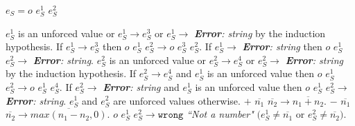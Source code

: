 \begin{case}

$e_{S}=o$ $e_{S}^{1}$ $e_{S}^{2}$

$e_{S}^{1}$ is an unforced value or $e_{S}^{1}\rightarrow e_{S}^{3}$ or $e_{S}^{1}\rightarrow$ \emph{\textbf{Error}: string} by the induction hypothesis.  If $e_{S}^{1}\rightarrow e_{S}^{3}$ then $o$ $e_{S}^{1}$ $e_{S}^{2}\rightarrow o$ $e_{S}^{3}$ $e_{S}^{2}$.  If $e_{S}^{1}\rightarrow$ \emph{\textbf{Error}: string} then $o$ $e_{S}^{1}$ $e_{S}^{2}\rightarrow$ \emph{\textbf{Error}: string}.  $e_{S}^{2}$ is an unforced value or $e_{S}^{2}\rightarrow e_{S}^{4}$ or $e_{S}^{2}\rightarrow$ \emph{\textbf{Error}: string} by the induction hypothesis.  If $e_{S}^{2}\rightarrow e_{S}^{4}$ and $e_{S}^{1}$ is an unforced value then $o$ $e_{S}^{1}$ $e_{S}^{2}\rightarrow o$ $e_{S}^{1}$ $e_{S}^{4}$.  If $e_{S}^{2}\rightarrow$ \emph{\textbf{Error}: string} and $e_{S}^{1}$ is an unforced value then $o$ $e_{S}^{1}$ $e_{S}^{2}\rightarrow$ \emph{\textbf{Error}: string}.  $e_{S}^{1}$ and $e_{S}^{2}$ are unforced values otherwise.  $+$ $\overline{n_{1}}$ $\overline{n_{2}}\rightarrow\overline{n_{1}+n_{2}}$.  $-$ $\overline{n_{1}}$ $\overline{n_{2}}\rightarrow\overline{max(n_{1}-n_{2},0)}$.  $o$ $e_{S}^{1}$ $e_{S}^{2}\rightarrow\mathtt{wrong}$ \emph{``Not a number"} $(e_{S}^{1}\neq\overline{n_{1}}$ or $e_{S}^{2}\neq\overline{n_{2}})$.

\end{case}